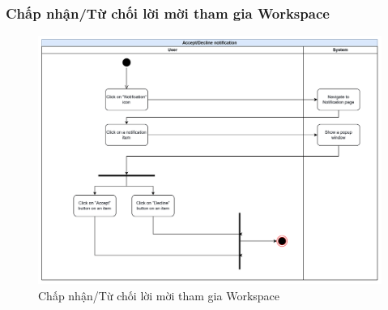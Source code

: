 \subsubsection{Chấp nhận/Từ chối lời mời tham gia Workspace}
\begin{figure}[H]
    \centering
    \includegraphics[width=\linewidth]{Content/Phân tích và thiết kế hệ thống/documents/Sơ đồ hoạt động/images/acceptDeclineNotification.png}
    \vspace{0.5cm}
    \caption{Chấp nhận/Từ chối lời mời tham gia Workspace}
    \label{fig:Chấp nhận/Từ chối lời mời tham gia Workspace}
\end{figure}